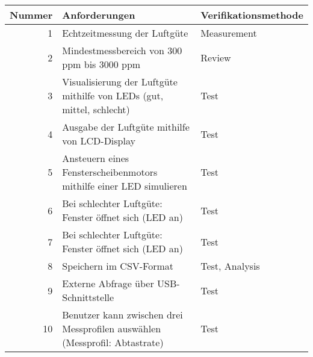 \label{Anforderungen}

\begin{table}[!hbt]
	
	\centering
	
	\begin{tabular}{|r| p{8.4cm}|p{4.7cm}|}
		
		\hline
		Nummer & Anforderungen & Verifikationsmethode \\
		\hline
		1 & Echtzeitmessung der Luftgüte & Measurement \\
		\hline
		2 & Mindestmessbereich von 300 ppm bis 3000 ppm & Review \\
		\hline
		3 & Visualisierung der Luftgüte mithilfe von LEDs (gut, mittel, schlecht) & Test \\
		\hline
		4 & Ausgabe der Luftgüte mithilfe von LCD-Display & Test \\
		\hline
		5 & Ansteuern eines Fensterscheibenmotors mithilfe einer LED simulieren & Test \\
		\hline
		6 & Bei schlechter Luftgüte: Fenster öffnet sich (LED an) & Test \\
		\hline
		7 & Bei schlechter Luftgüte: Fenster öffnet sich (LED an) & Test \\
		\hline
		8 & Speichern im CSV-Format & Test, Analysis\\
		\hline
		9 & Externe Abfrage über USB-Schnittstelle & Test \\
		\hline
		10 & Benutzer kann zwischen drei Messprofilen auswählen (Messprofil: Abtastrate) & Test \\
		\hline
		
	\end{tabular}

\label{tab:Anforderungen}

\end{table}